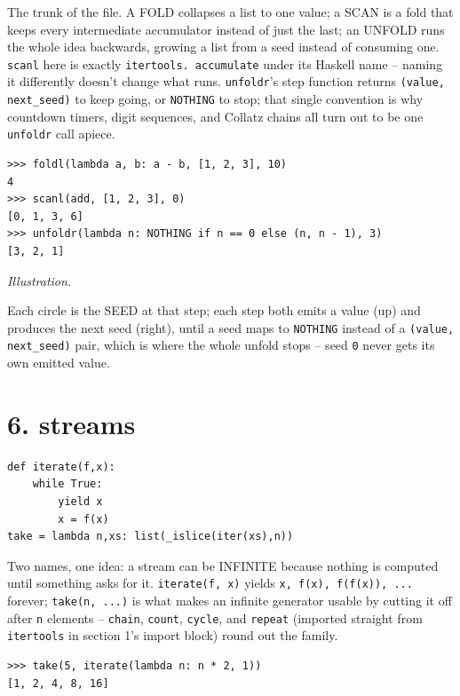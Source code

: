 \documentclass[10pt,letterpaper]{book}
\begin{document}
The trunk of the file. A FOLD collapses a list to one value; a SCAN is a fold that keeps every
intermediate accumulator instead of just the last; an UNFOLD runs the whole idea backwards, growing
a list from a seed instead of consuming one. \texttt{scanl} here is exactly \texttt{itertools.
accumulate} under its Haskell name -- naming it differently doesn't change what runs.
\texttt{unfoldr}'s step function returns \texttt{(value, next\_seed)} to keep going, or
\texttt{NOTHING} to stop; that single convention is why countdown timers, digit sequences, and
Collatz chains all turn out to be one \texttt{unfoldr} call apiece.
\begin{lstlisting}[style=ex]
>>> foldl(lambda a, b: a - b, [1, 2, 3], 10)
4
>>> scanl(add, [1, 2, 3], 0)
[0, 1, 3, 6]
>>> unfoldr(lambda n: NOTHING if n == 0 else (n, n - 1), 3)
[3, 2, 1]
\end{lstlisting}
\noindent\textit{Illustration.}
\begin{center}
\end{center}
Each circle is the SEED at that step; each step both emits a value (up) and produces the next seed
(right), until a seed maps to \texttt{NOTHING} instead of a \texttt{(value, next\_seed)} pair, which
is where the whole unfold stops -- seed \texttt{0} never gets its own emitted value.
\section*{6. streams}
\begin{lstlisting}[style=code]
def iterate(f,x):
    while True:
        yield x
        x = f(x)
take = lambda n,xs: list(_islice(iter(xs),n))
\end{lstlisting}

Two names, one idea: a stream can be INFINITE because nothing is computed until something asks for
it. \texttt{iterate(f, x)} yields \texttt{x, f(x), f(f(x)), ...} forever; \texttt{take(n, ...)} is
what makes an infinite generator usable by cutting it off after \texttt{n} elements -- \texttt{chain},
\texttt{count}, \texttt{cycle}, and \texttt{repeat} (imported straight from \texttt{itertools} in
section 1's import block) round out the family.
\begin{lstlisting}[style=ex]
>>> take(5, iterate(lambda n: n * 2, 1))
[1, 2, 4, 8, 16]
\end{lstlisting}
\end{document}
